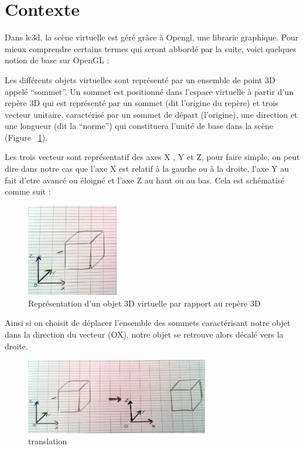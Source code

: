 \section{Contexte}

Dans \gls{lc3d}, la scène virtuelle est géré grâce à Opengl, une \gls{librarie} graphique.
Pour mieux comprendre certains termes qui seront abbordé par la suite, voici quelques notion de base sur OpenGL :

Les différents objets virtuelles sont représenté par un ensemble de point 3D appelé “sommet”.
Un sommet est positionné dans l’espace virtuelle à partir d’un repère 3D qui est représenté par un sommet (dit l’origine du repère) et trois vecteur unitaire, caractérisé par un sommet de départ (l’origine), une direction et une longueur (dit la “norme”) qui constituera l’unité de base dans la scène (Figure ~\ref{fig:repere}).

Les trois vecteur sont représentatif des axes X , Y et Z,  pour faire simple, on peut dire dans notre cas que l’axe X est relatif à la gauche ou à la droite, l’axe Y au fait d’etre avancé ou éloigné et l’axe Z au haut ou au bas. Cela est schématisé comme suit : 

\begin{figure}[!ht]
\centering
\includegraphics[width = 4cm] {images/croquisRepere3d.jpg} 
\caption{Représentation d'un objet 3D virtuelle par rapport au repère 3D}
\label{fig:repere}
\end{figure}

Ainsi si on choisit de déplacer l’ensemble des sommets caractérisant notre objet dans la direction du vecteur (OX), notre objet se retrouve alors décalé vers la droite.

\begin{figure}[!ht]
\centering
\includegraphics[width = 8cm] {images/croquisTranslation.jpg}
\caption{translation}
\label{fig:transformation}
\end{figure}

